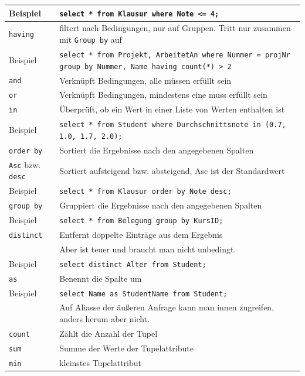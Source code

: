 \documentclass{article}
\begin{document}
\begin{center}
\begin{longtable}{|p{4cm}|p{7cm}|}
    \hline
    Beispiel & \texttt{select * from Klausur where Note <= 4;} \\
    \hline
    \texttt{having} & filtert nach Bedingungen, nur auf Gruppen. Tritt nur zusammen mit \texttt{Group by} auf \\
    \hline
    Beispiel & \texttt{select * from Projekt, ArbeitetAn where Nummer = projNr group by Nummer, Name having count(*) > 2} \\
    \hline
    \texttt{and} & Verknüpft Bedingungen, alle müssen erfüllt sein \\
    \hline
    \texttt{or} & Verknüpft Bedingungen, mindestens eine muss erfüllt sein \\
    \hline
    \texttt{in} & Überprüft, ob ein Wert in einer Liste von Werten enthalten ist \\
    \hline
    Beispiel & \texttt{select * from Student where Durchschnittsnote in (0.7, 1.0, 1.7, 2.0);} \\
    \hline
    \texttt{order by} & Sortiert die Ergebnisse nach den angegebenen Spalten \\
    \hline
    \texttt{Asc} bzw. \texttt{desc} & Sortiert aufsteigend bzw. absteigend, Asc ist der Standardwert \\
    \hline
    Beispiel & \texttt{select * from Klausur order by Note desc;} \\
    \hline
    \texttt{group by} & Gruppiert die Ergebnisse nach den angegebenen Spalten \\
    \hline
    Beispiel & \texttt{select * from Belegung group by KursID;} \\
    \hline
    \texttt{distinct} & Entfernt doppelte Einträge aus dem Ergebnis \\
    & Aber ist teuer und braucht man nicht unbedingt.\\
    \hline
    Beispiel & \texttt{select distinct Alter from Student;} \\
    \hline
    \texttt{as} & Benennt die Spalte um \\
    Beispiel & \texttt{select Name as StudentName from Student;} \\
    & Auf Aliasse der äußeren Anfrage kann man innen zugreifen, anders herum aber nicht. \\
    \hline
    \texttt{count} & Zählt die Anzahl der Tupel \\
    \hline
    \texttt{sum} & Summe der Werte der Tupelattribute \\
    \hline
    \texttt{min} & kleinstes Tupelattribut \\

\end{longtable}
\end{center}
\end{document}
